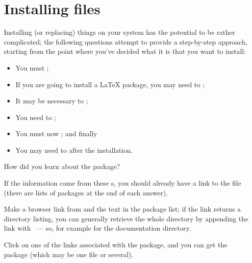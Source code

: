 
\section{Installing \AllTeX{} files}


Installing (or replacing) things on your \AllTeX{} system has the
potential to be rather complicated; the following questions attempt to
provide a step-by-step approach, starting from the point where you've
decided what it is that you want to install:
\begin{itemize}
\item You must ;
\item If you are going to install a \LaTeX{} package, you may need to
  ;
\item It may be necessary to %
  ;
\item You need to %
  ;
\item You must now ; and
  finally
\item You may need to  after the installation.
\end{itemize}


How did you learn about the package?

If the information came from these s, you should already
have a link to the file (there are lists of packages at the end of
each answer).
\begin{narrowversion}
  Make a browser link from  and the text
  in the package list; if the link returns a directory listing, you can
  generally retrieve the whole directory by appending the link with
  ~--- so, for example
   for the \latex{}
  documentation directory.
\end{narrowversion}
\begin{wideversion}
  Click on one of the links associated with the package, and you can
  get the package (which may be one file or several).
\end{wideversion}

